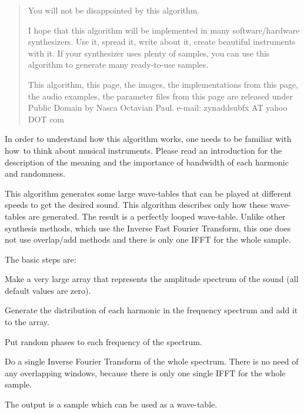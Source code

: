    \begin{quotation}
      You will not be disappointed by this algorithm.

      I hope that this algorithm will be implemented in many software/hardware
      synthesizers. Use it, spread it, write about it, create beautiful
      instruments with it. If your synthesizer uses plenty of samples, you can
      use this algorithm to generate many ready-to-use samples.

      This algorithm, this page, the images, the implementations from this
      page, the audio examples, the parameter files from this page
      are released under Public Domain by Nasca Octavian Paul.
      e-mail: zynaddsubfx AT yahoo DOT com
   \end{quotation}

   In order to understand how this algorithm works, one needs to be familiar
   with how to think about musical instruments. Please read an introduction
   for the description of the meaning and the importance of bandwidth of each
   harmonic and randomness.

   This algorithm generates some large wave-tables that can be played at
   different speeds to get the desired sound. This algorithm describes only
   how these wave-tables are generated. The result is a perfectly looped
   wave-table.  Unlike other synthesis methods, which use the
   Inverse Fast Fourier Transform, this one does not use overlap/add methods
   and there is only one IFFT for the whole sample.

   The basic steps are:

   \begin{enumber}
      \item Make a very large array that represents the amplitude spectrum of
         the sound (all default values are zero).
      \item Generate the distribution of each harmonic in the frequency
         spectrum and add it to the array.
      \item Put random phases to each frequency of the spectrum.
      \item Do a single Inverse Fourier Transform of the whole spectrum. There
         is no need of any overlapping windows, because there is only one
         single IFFT for the whole sample. 
   \end{enumber}

   The output is a sample which can be used as a wave-table.



